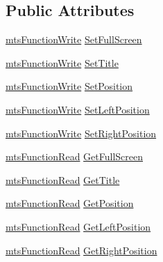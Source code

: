 \subsection*{Public Attributes}
\begin{DoxyCompactItemize}
\item 
\hyperlink{classmts_function_write}{mts\-Function\-Write} \hyperlink{class_i_req_filter_image_window_a64e90d5af4304eb57bc78d2c303225b4}{Set\-Full\-Screen}
\item 
\hyperlink{classmts_function_write}{mts\-Function\-Write} \hyperlink{class_i_req_filter_image_window_a40613d2152c6d25017adf0f724dc04a4}{Set\-Title}
\item 
\hyperlink{classmts_function_write}{mts\-Function\-Write} \hyperlink{class_i_req_filter_image_window_a55437ed8b64ffeb5a155793c49d10425}{Set\-Position}
\item 
\hyperlink{classmts_function_write}{mts\-Function\-Write} \hyperlink{class_i_req_filter_image_window_ac2dc528355ba785828389417e5d0caac}{Set\-Left\-Position}
\item 
\hyperlink{classmts_function_write}{mts\-Function\-Write} \hyperlink{class_i_req_filter_image_window_a7f5e8c1b5bbbf3e1f9ea90836f36b4cf}{Set\-Right\-Position}
\item 
\hyperlink{classmts_function_read}{mts\-Function\-Read} \hyperlink{class_i_req_filter_image_window_ab33c03a38551f95a195b05aadcd104dc}{Get\-Full\-Screen}
\item 
\hyperlink{classmts_function_read}{mts\-Function\-Read} \hyperlink{class_i_req_filter_image_window_a3dc54b8a14bb8d947e0e0daae5aef025}{Get\-Title}
\item 
\hyperlink{classmts_function_read}{mts\-Function\-Read} \hyperlink{class_i_req_filter_image_window_a27d1038d8e50eb558173e5fa60f15354}{Get\-Position}
\item 
\hyperlink{classmts_function_read}{mts\-Function\-Read} \hyperlink{class_i_req_filter_image_window_a5b6bfed6bbba99b634ddf86537bb36de}{Get\-Left\-Position}
\item 
\hyperlink{classmts_function_read}{mts\-Function\-Read} \hyperlink{class_i_req_filter_image_window_a172bda142519b8cbd7b438f0e9620034}{Get\-Right\-Position}
\end{DoxyCompactItemize}


